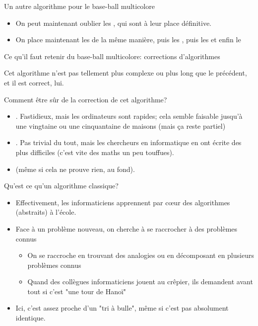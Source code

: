 \documentclass[final,hyperref={pdfpagelabels=false}]{beamer}
\renewenvironment{Coupe}{   }{   }
\begin{document}
\begin{Coupe}
\begin{frame}{Un autre algorithme pour le base-ball multicolore}
  \begin{itemize}
  \item On peut maintenant oublier les , qui sont à leur place définitive.
  \item On place maintenant les  de la même manière, puis les ,
    puis les  et enfin le 
  \end{itemize}
\end{frame}
\end{Coupe}
\begin{frame}{Ce qu'il faut retenir du base-ball multicolore: corrections d'algorithmes}

  Cet algorithme n'est pas tellement plus complexe ou plus long que le
  précédent, et il est correct, lui.

  \begin{block}{Comment être sûr de la \alert{correction} de cet algorithme?}
    \begin{itemize}
    \item {}. Fastidieux, mais les
      ordinateurs sont rapides; cela semble faisable jusqu'à une vingtaine ou
      une cinquantaine de maisons (mais ça reste partiel)
    \item {}. Pas trivial
      du tout, mais les chercheurs en informatique en ont écrite des plus
      difficiles (c'est vite des maths un peu touffues).
    \item {} (même
      si cela ne prouve rien, au fond).
    \end{itemize}
  \end{block}

  \begin{block}{Qu'est ce qu'un \alert{algorithme classique}?}
    \begin{itemize}
    \item Effectivement, les informaticiens apprennent par cœur des algorithmes
      (abstraits) à l'école.
    \item Face à un problème nouveau, on cherche à se raccrocher à des
      problèmes connus
      \begin{itemize}
      \item On se raccroche en trouvant des analogies ou en décomposant en
        plusieurs problèmes connus
      \item Quand des collègues informaticiens jouent au crêpier, ils demandent
        avant tout si c'est "une tour de Hanoï" 
      \end{itemize}
    \item Ici, c'est assez proche d'un "tri à bulle", même si c'est pas
      absolument identique.
    \end{itemize}
  \end{block}


\end{frame}
\end{document}
